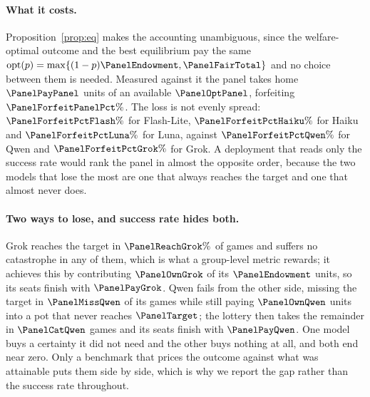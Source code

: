 \paragraph{What it costs.}
Proposition~\ref{prop:eq} makes the accounting unambiguous, since the welfare-optimal
outcome and the best equilibrium pay the same
$\mathrm{opt}(p)=\max\{(1-p)\PanelEndowment,\PanelFairTotal\}$ and no choice between them is
needed. Measured against it the panel takes home $\PanelPayPanel$ units of an available
$\PanelOptPanel$, forfeiting $\PanelForfeitPanelPct\%$. The loss is not evenly spread:
$\PanelForfeitPctFlash\%$ for Flash-Lite,
$\PanelForfeitPctHaiku\%$ for Haiku and
$\PanelForfeitPctLuna\%$ for Luna, against
$\PanelForfeitPctQwen\%$ for Qwen and $\PanelForfeitPctGrok\%$ for
Grok. A deployment that reads only the success rate would rank
the panel in almost the opposite order, because the two models that lose the most are one
that always reaches the target and one that almost never does.

\paragraph{Two ways to lose, and success rate hides both.}
Grok reaches the target in $\PanelReachGrok\%$ of games and
suffers no catastrophe in any of them, which is what a group-level metric rewards; it
achieves this by contributing $\PanelOwnGrok$ of its $\PanelEndowment$ units, so its seats
finish with $\PanelPayGrok$. Qwen fails from the other side, missing the
target in $\PanelMissQwen$ of its games while still paying $\PanelOwnQwen$ units into a pot
that never reaches $\PanelTarget$; the lottery then takes the remainder in
$\PanelCatQwen$ games and its seats finish with $\PanelPayQwen$. One model buys a
certainty it did not need and the other buys nothing at all, and both end near zero. Only a
benchmark that prices the outcome against what was attainable puts them side by side, which
is why we report the gap rather than the success rate throughout.
